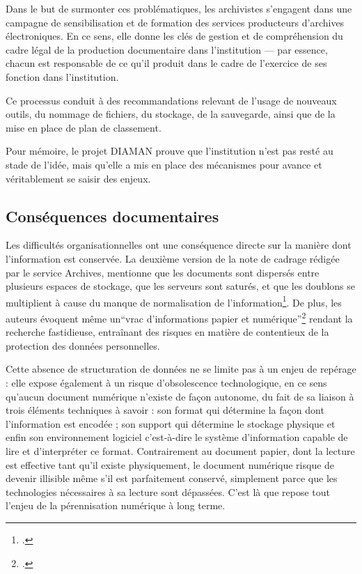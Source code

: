 Dans le but de surmonter ces problématiques, les archivistes s’engagent dans une campagne de sensibilisation et de formation des services producteurs d’archives électroniques. En ce sens, elle donne les clés de gestion et de compréhension du cadre légal de la production documentaire dans l'institution — par essence, chacun est responsable de ce qu'il produit dans le cadre de l'exercice de ses fonction dans l'institution.

Ce processus conduit à des recommandations relevant de l’usage de nouveaux outils, du nommage de fichiers, du stockage, de la sauvegarde, ainsi que de la mise en place de plan de classement.

Pour mémoire, le projet DIAMAN prouve que l'institution n'est pas resté au stade de l'idée, mais qu'elle a mis en place des mécanismes pour avance et véritablement se saisir des enjeux.


\subsection*{Conséquences documentaires }

Les difficultés organisationnelles ont une conséquence directe sur la manière dont l’information est conservée. La deuxième version de la note de cadrage rédigée par le service Archives, mentionne que les documents sont dispersés entre plusieurs espaces de stockage, que les serveurs sont saturés, et que les doublons se multiplient à cause du manque de normalisation de l’information\footcite[version 2.]{bomel-dion-note-cadrage}.  De plus, les auteurs évoquent même un\enquote{vrac d'informations papier et numérique}\footcite[version 4, p.~4]{bomel-dion-note-cadrage} rendant la recherche fastidieuse, entraînant des risques en matière de contentieux de la protection des données personnelles.

Cette absence de structuration de données ne se limite pas à un enjeu de repérage : elle expose également à un risque d’obsolescence technologique, en ce sens qu’aucun document numérique n’existe de façon autonome, du fait de sa liaison à trois éléments techniques à savoir : son format qui détermine la façon dont l’information est encodée ; son support qui détermine le stockage physique et enfin son environnement logiciel c’est-à-dire le système d’information capable de lire et d’interpréter ce format. Contrairement au document papier, dont la lecture est effective tant qu’il existe physiquement, le document numérique risque de devenir illisible même s’il est parfaitement conservé, simplement parce que les technologies nécessaires à sa lecture sont dépassées. C’est là que repose tout l’enjeu de la pérennisation numérique à long terme.

